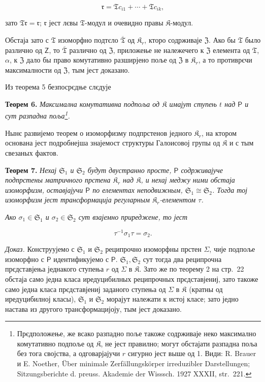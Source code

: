 \documentclass[11pt]{article}
\newcommand{\srcfn}[2]{\footnote{#2}}
\newcommand{\foreign}[1]{#1}
\begin{document}
\[
\mathfrak r=\mathfrak T c_{i1}+\cdots+\mathfrak T c_{ik},
\]

зато \(\mathfrak T\mathfrak r=\mathfrak r\); \(\mathfrak r\) јест лєвы \(\mathfrak T\)-модул и очевидно правы \(\mathfrak K\)-модул.

Обстаја зато с \(\mathfrak T\) изоморфно подтєло \(\overline{\mathfrak T}\) од \(\mathfrak K_r\), кторо содрживаје \(\mathfrak Z\). Ако бы \(\mathfrak T\) было различно од \(\mathsf{Z}\), то \(\overline{\mathfrak T}\) различно од \(\mathfrak Z\), приложење не належечего к \(\mathfrak Z\) елемента од \(\mathfrak T\), \(\alpha\), к \(\mathfrak Z\) дало бы право комутативно разширјено поље од \(\mathfrak Z\) в \(\mathfrak K_r\), а то противрєчи максималности од \(\mathfrak Z\), тым јест доказано.

Из теорема 5 безпосрєдње слєдује

\textbf{Теорем 6.} \emph{Максимална комутативна подпоља од \(\mathfrak K\) имајут ступењ \(t\) над \(\mathsf P\) и сут разпадна поља\srcfn{1}{Прєдположење, же всако разпадно поље такоже содрживаје неко максимално комутативно подпоље од \(\mathfrak K\), не јест правилно; могут обстајати разпадна поља без тога својства, а одговарјајучи \(r\) сигурно јест выше од 1. Види: \foreign{R. Brauer} и \foreign{E. Noether}, \foreign{Über minimale Zerfällungskörper irreduzibler Darstellungen; Sitzungsberichte d. preuss. Akademie der Wisssch. 1927 XXXII, str.~221.}}.}

Нынє развијемо теорем о изоморфизму подпрстенов једного \(\mathfrak K_r\), на ктором основана јест подробнејша знајемост структуры Галоисовој групы од \(\mathfrak K\) и с тым свезаных фактов.

\textbf{Теорем 7.} \emph{Нехај \(\mathfrak S_1\) и \(\mathfrak S_2\) будут двустранно просте, \(\mathsf P\) содрживајуче подпрстены матричного прстена \(\mathfrak K_r\) над \(\mathfrak K\), и нехај меджу ними обстаја изоморфизм, оставјајучи \(\mathsf P\) по елементах неподвижным, \(\mathfrak S_1\cong\mathfrak S_2\). Тогда тој изоморфизм јест трансформација регуларным \(\mathfrak K_r\)-елементом \(\tau\).}

\emph{Ако \(\sigma_1\in\mathfrak S_1\) и \(\sigma_2\in\mathfrak S_2\) сут взајемно приреджене, то јест}

\[
\tau^{-1}\sigma_1\tau=\sigma_2.
\]

\emph{Доказ.} Конструујемо с \(\mathfrak S_1\) и \(\mathfrak S_2\) реципрочно изоморфны прстен \(\Sigma\), чије подпоље изоморфно с \(\mathsf P\) идентификујемо с \(\mathsf P\). \(\mathfrak S_1,\mathfrak S_2\) сут тогда два реципрочна прєдставјења једнакого ступења \(r\) од \(\Sigma\) в \(\mathfrak K\). Зато же по теорему 2 на стр.~22 обстаја само једна класа иредуцибилных реципрочных прєдставјениј, зато такоже само једна класа прєдставјениј заданого ступења од \(\Sigma\) в \(\mathfrak K\) (кратны од иредуцибилној класы), \(\mathfrak S_1\) и \(\mathfrak S_2\) морајут належати к истој класе; зато једно настава из другого трансформацијоју, тым јест доказано.
\end{document}
